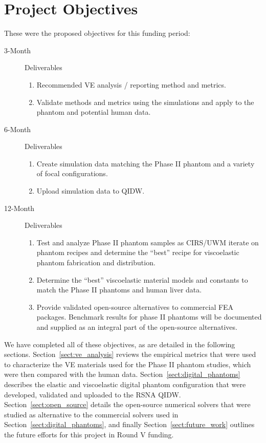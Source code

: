 \section{Project Objectives}

These were the proposed objectives for this funding period:

\begin{description}
    \item[3-Month] Deliverables
        \begin{enumerate}
            \item Recommended VE analysis / reporting method and metrics. 
            \item Validate methods and metrics using the simulations and apply
                to the phantom and potential human data.
        \end{enumerate}

    \item[6-Month] Deliverables
        \begin{enumerate}
            \item Create simulation data matching the Phase II phantom and a
                variety of focal configurations.
            \item Upload simulation data to QIDW\@.
        \end{enumerate}

    \item[12-Month] Deliverables
        \begin{enumerate}
            \item Test and analyze Phase II phantom samples as CIRS/UWM iterate
                on phantom recipes and determine the “best” recipe for
                viscoelastic phantom fabrication and distribution.
            \item Determine the ``best'' viscoelastic material models and
                constants to match the Phase II phantoms and human liver data.
            \item Provide validated open-source alternatives to commercial FEA
                packages. Benchmark results for phase II phantoms will be
                documented and supplied as an integral part of the open-source
                alternatives.
        \end{enumerate}

\end{description}

We have completed all of these objectives, as are detailed in the following
sections.  Section~\ref{sect:ve_analysis} reviews the empirical metrics that
were used to characterize the VE materials used for the Phase II phantom
studies, which were then compared with the human data.
Section~\ref{sect:digital_phantoms} describes the elastic and viscoelastic
digital phantom configuration that were developed, validated and uploaded to
the RSNA QIDW\@.  Section~\ref{sect:open_source} details the open-source numerical
solvers that were studied as alternative to the commercial solvers used in
Section~\ref{sect:digital_phantoms}, and finally Section~\ref{sect:future_work}
outlines the future efforts for this project in Round V funding.
